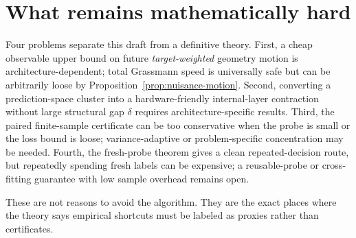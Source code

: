 \section{What remains mathematically hard}
Four problems separate this draft from a definitive theory. First, a cheap observable upper bound on future \emph{target-weighted} geometry motion is architecture-dependent; total Grassmann speed is universally safe but can be arbitrarily loose by Proposition~\ref{prop:nuisance-motion}. Second, converting a prediction-space cluster into a hardware-friendly internal-layer contraction without large structural gap $\delta$ requires architecture-specific results. Third, the paired finite-sample certificate can be too conservative when the probe is small or the loss bound is loose; variance-adaptive or problem-specific concentration may be needed. Fourth, the fresh-probe theorem gives a clean repeated-decision route, but repeatedly spending fresh labels can be expensive; a reusable-probe or cross-fitting guarantee with low sample overhead remains open.

These are not reasons to avoid the algorithm. They are the exact places where the theory says empirical shortcuts must be labeled as proxies rather than certificates.

